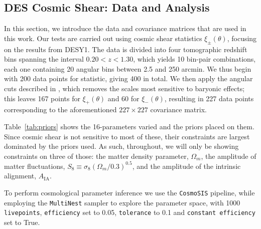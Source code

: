 \documentclass[aps, prd, twocolumn, superscriptaddress, nofootinbib, amssymb, amsmath]{revtex4-2}
\begin{document}
\subsection{DES Cosmic Shear: Data and Analysis}
\label{subsec:data_and_analysis}

In this section, we introduce the data and covariance matrices that are used in this work. Our tests are carried out using cosmic shear statistics $\xi_\pm(\theta)$, focusing on the results from DESY1. The data is divided into four tomographic redshift bins spanning the interval $0.20 < z < 1.30$, which yields 10 bin-pair combinations, each one containing 20 angular bins between 2.5 and 250 arcmin. We thus begin with 200 data points for statistic, giving 400 in total. We then apply the angular cuts described in \cite{Abbott:2018cms}, which removes the scales most sensitive to baryonic effects; this leaves 167 points for $\xi_+(\theta)$ and 60 for $\xi_-(\theta)$, resulting in 227 data points corresponding to the aforementioned $227 \times 227$ covariance matrix. 

Table~\ref{tab:priors} shows the 16-parameters varied and the priors placed on them. Since cosmic shear is not sensitive to most of these, their constraints are largest dominated by the priors used. As such, throughout, we will only be showing constraints on three of those: the matter density parameter, $\Omega_m$, the amplitude of matter fluctuations, $S_8 \equiv \sigma_8 (\Omega_m/0.3)^{0.5}$, and the amplitude of the intrinsic alignment, $A_{\text{IA}}$.

To perform cosmological parameter inference we use the \texttt{CosmoSIS} \cite{Zuntz:2015med, Lewis:2000taj, Kirk:2012mnras, Kilbinger:2009aa, Howlett:2012jcap, Bridle:2007njp, Takahashi:2012taj, Smith:2003mnras} pipeline, while employing the \texttt{MultiNest} \cite{Feroz:2009fhb} sampler to explore the parameter space, with 1000 \texttt{livepoints}, \texttt{efficiency} set to 0.05, \texttt{tolerance} to 0.1 and \texttt{constant efficiency} set to True.
\end{document}
